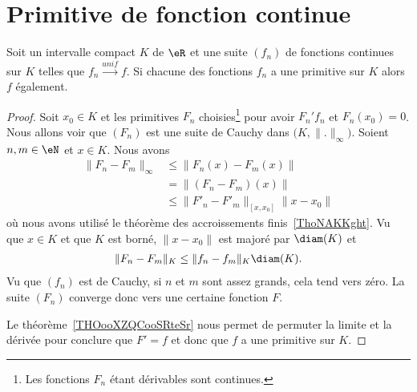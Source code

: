 \section{Primitive de fonction continue}

\begin{proposition}    \label{PropQACVooBnHtRJ}
    Soit un intervalle compact \( K\) de \( \eR\) et une suite \( (f_n)\) de fonctions continues sur \( K\) telles que \( f_n\stackrel{unif}{\longrightarrow}f\). Si chacune des fonctions \( f_n\) a une primitive sur \( K\) alors \( f\) également.
\end{proposition}

\begin{proof}
    Soit \( x_0\in K\) et les primitives \( F_n\) choisies\footnote{Les fonctions \( F_n\) étant dérivables sont continues.} pour avoir \( F_n'f_n\) et \( F_n(x_0)=0\). Nous allons voir que \( (F_n)\) est une suite de Cauchy dans \( \big( K,\| . \|_{\infty} \big)\). Soient \( n,m\in \eN\) et \( x\in K\). Nous avons
    \begin{subequations}
        \begin{align}
            \| F_n-F_m \|_{\infty}&\leq \| F_n(x)-F_m(x) \|\\
            &=\| (F_n-F_m)(x) \|\\
            &\leq \| F'_n-F'_m \|_{[x,x_0]}\| x-x_0 \|
        \end{align}
    \end{subequations}
    où nous avons utilisé le théorème des accroissements finis~\ref{ThoNAKKght}. Vu que \( x\in K\) et que \( K\) est borné, \( \| x-x_0 \|\) est majoré par \( \diam(K)\) et
    \begin{subequations}
        \begin{align}
            \| F_n-F_m \|_K\leq \| f_n-f_m \|_K\diam(K).
        \end{align}
    \end{subequations}
    Vu que \( (f_n) \) est de Cauchy, si \( n\) et \( m\) sont assez grands, cela tend vers zéro. La suite \( (F_n)\) converge donc vers une certaine fonction \( F\).

    Le théorème~\ref{THOooXZQCooSRteSr} nous permet de permuter la limite et la dérivée pour conclure que \( F'=f\) et donc que \( f\) a une primitive sur \( K\).
\end{proof}


